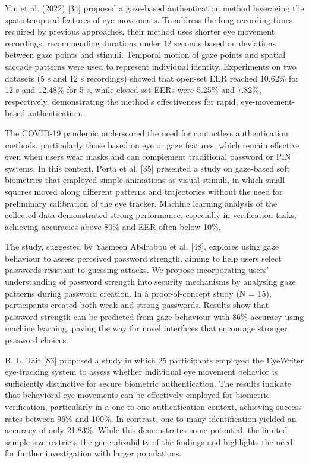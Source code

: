 \documentclass[12pt]{report}
\begin{document}
Yin et al. (2022) [34] proposed a gaze-based authentication method leveraging the spatiotemporal features of eye movements.
To address the long recording times required by previous approaches, their method uses shorter eye movement recordings, recommending durations under 12 seconds based on deviations between gaze points and stimuli.
Temporal motion of gaze points and spatial saccade patterns were used to represent individual identity.
Experiments on two datasets (5 s and 12 s recordings) showed that open-set EER reached 10.62\% for 12 s and 12.48\% for 5 s, while closed-set EERs were 5.25\% and 7.82\%, respectively, demonstrating the method's effectiveness for rapid, eye-movement-based authentication.

The COVID-19 pandemic underscored the need for contactless authentication methods, particularly those based on eye or gaze features, which remain effective even when users wear masks and can complement traditional password or PIN systems. 
In this context, Porta et al. [35] presented a study on gaze-based soft biometrics that employed simple animations as visual stimuli, in which small squares moved along different patterns and trajectories without the need for preliminary calibration of the eye tracker. 
Machine learning analysis of the collected data demonstrated strong performance, especially in verification tasks, achieving accuracies above 80\% and EER often below 10\%.

The study, suggested by Yasmeen Abdrabou et al. [48], explores using gaze behaviour to assess perceived password strength, aiming to help users select passwords resistant to guessing attacks. 
We propose incorporating users' understanding of password strength into security mechanisms by analysing gaze patterns during password creation.
In a proof-of-concept study (N = 15), participants created both weak and strong passwords.
Results show that password strength can be predicted from gaze behaviour with 86\% accuracy using machine learning, paving the way for novel interfaces that encourage stronger password choices.

B. L. Tait [83] proposed a study in which 25 participants employed the EyeWriter eye-tracking system to assess whether individual eye movement behavior is sufficiently distinctive for secure biometric authentication.
The results indicate that behavioral eye movements can be effectively employed for biometric verification, particularly in a one-to-one authentication context, achieving success rates between 96\% and 100\%.
In contrast, one-to-many identification yielded an accuracy of only 21.83\%. 
While this demonstrates some potential, the limited sample size restricts the generalizability of the findings and highlights the need for further investigation with larger populations.
\end{document}

